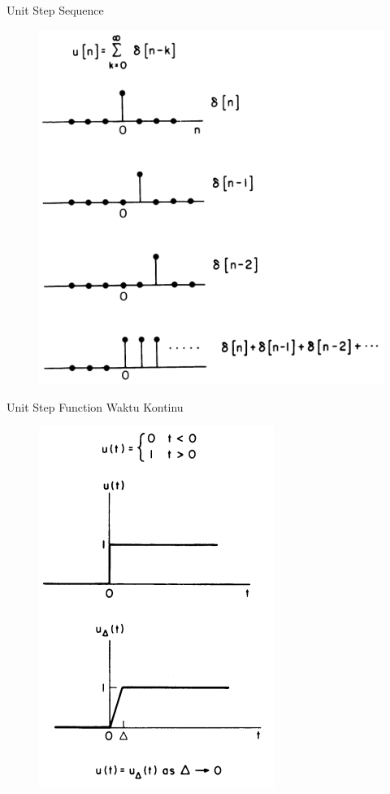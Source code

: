 \documentclass[pdflatex,compress,mathserif]{beamer}
\begin{document}
\begin{frame}{Unit Step Sequence}
	\begin{figure}
		\centering
		\includegraphics[height=0.8\textheight]{img/02.slide_04}
	\end{figure}
\end{frame}

\begin{frame}{Unit Step Function Waktu Kontinu}
	\begin{figure}
		\centering
		\includegraphics[height=0.8\textheight]{img/02.slide_05}
	\end{figure}
\end{frame}
\end{document}
